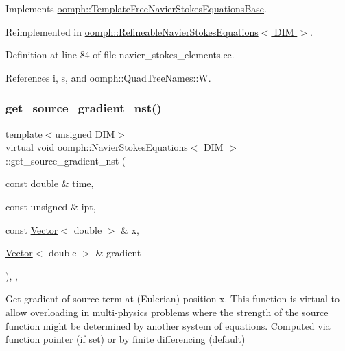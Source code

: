 Implements \hyperlink{classoomph_1_1TemplateFreeNavierStokesEquationsBase_aeb1a1fc53b7e8b25ace065e0b5fd5eff}{oomph\+::\+Template\+Free\+Navier\+Stokes\+Equations\+Base}.



Reimplemented in \hyperlink{classoomph_1_1RefineableNavierStokesEquations_a94c16c8b4aa810e9e2f8df263654eaed}{oomph\+::\+Refineable\+Navier\+Stokes\+Equations$<$ D\+I\+M $>$}.



Definition at line 84 of file navier\+\_\+stokes\+\_\+elements.\+cc.



References i, s, and oomph\+::\+Quad\+Tree\+Names\+::W.

\mbox{\label{classoomph_1_1NavierStokesEquations_a5dfbaf5de472600c889c681cf3d4ffb7}} 
\subsubsection{\texorpdfstring{get\+\_\+source\+\_\+gradient\+\_\+nst()}{get\_source\_gradient\_nst()}}
{\footnotesize\ttfamily template$<$unsigned D\+IM$>$ \\
virtual void \hyperlink{classoomph_1_1NavierStokesEquations}{oomph\+::\+Navier\+Stokes\+Equations}$<$ D\+IM $>$\+::get\+\_\+source\+\_\+gradient\+\_\+nst (\begin{DoxyParamCaption}\item[{const double \&}]{time,  }\item[{const unsigned \&}]{ipt,  }\item[{const \hyperlink{classoomph_1_1Vector}{Vector}$<$ double $>$ \&}]{x,  }\item[{\hyperlink{classoomph_1_1Vector}{Vector}$<$ double $>$ \&}]{gradient }\end{DoxyParamCaption})\hspace{0.3cm}{\ttfamily [inline]}, {\ttfamily [protected]}, {\ttfamily [virtual]}}

Get gradient of source term at (Eulerian) position x. This function is virtual to allow overloading in multi-\/physics problems where the strength of the source function might be determined by another system of equations. Computed via function pointer (if set) or by finite differencing (default) 

